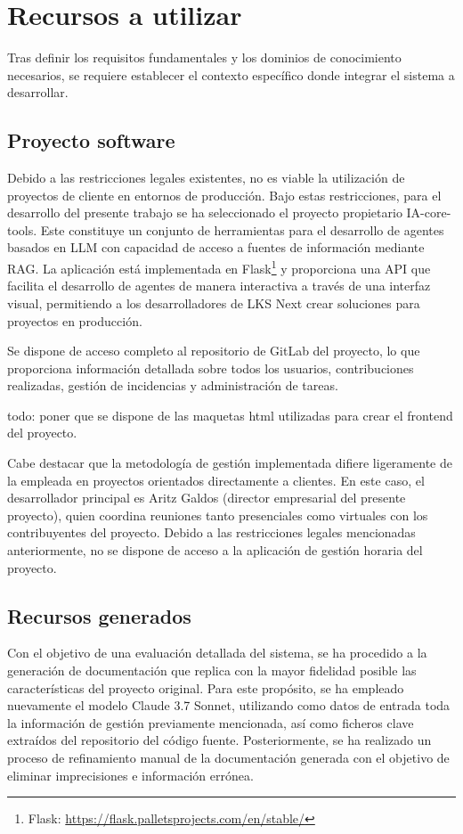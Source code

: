 \section{Recursos a utilizar}
Tras definir los requisitos fundamentales y los dominios de conocimiento necesarios, se requiere establecer el contexto específico donde integrar el sistema a desarrollar. 
\subsection{Proyecto software}

Debido a las restricciones legales existentes, no es viable la utilización de proyectos de cliente en entornos de producción. Bajo estas restricciones, para el desarrollo del presente trabajo se ha seleccionado el proyecto propietario IA-core-tools. Este constituye un conjunto de herramientas para el desarrollo de agentes basados en LLM con capacidad de acceso a fuentes de información mediante RAG. La aplicación está implementada en Flask\footnote{Flask: \url{https://flask.palletsprojects.com/en/stable/}} y proporciona una API que facilita el desarrollo de agentes de manera interactiva a través de una interfaz visual, permitiendo a los desarrolladores de LKS Next crear soluciones para proyectos en producción.

Se dispone de acceso completo al repositorio de GitLab del proyecto, lo que proporciona información detallada sobre todos los usuarios, contribuciones realizadas, gestión de incidencias y administración de tareas.

todo: poner que se dispone de las maquetas html utilizadas para crear el frontend del proyecto.

Cabe destacar que la metodología de gestión implementada difiere ligeramente de la empleada en proyectos orientados directamente a clientes. En este caso, el desarrollador principal es Aritz Galdos (director empresarial del presente proyecto), quien coordina reuniones tanto presenciales como virtuales con los contribuyentes del proyecto. Debido a las restricciones legales mencionadas anteriormente, no se dispone de acceso a la aplicación de gestión horaria del proyecto.

\subsection{Recursos generados}
Con el objetivo de una evaluación detallada del sistema, se ha procedido a la generación de documentación que replica con la mayor fidelidad posible las características del proyecto original. Para este propósito, se ha empleado nuevamente el modelo Claude 3.7 Sonnet, utilizando como datos de entrada toda la información de gestión previamente mencionada, así como ficheros clave extraídos del repositorio del código fuente. Posteriormente, se ha realizado un proceso de refinamiento manual de la documentación generada con el objetivo de eliminar imprecisiones e información errónea.

